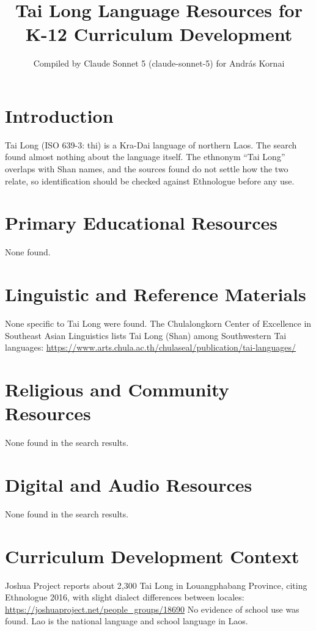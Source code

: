 \documentclass[12pt]{article}
\title{Tai Long Language Resources for K-12 Curriculum Development}
\author{Compiled by Claude Sonnet 5 (claude-sonnet-5) for Andr\'as Kornai}
\date{}
\begin{document}
\maketitle

\section{Introduction}
Tai Long (ISO 639-3: thi) is a Kra-Dai language of northern Laos. The search found almost nothing about the language itself. The ethnonym ``Tai Long'' overlaps with Shan names, and the sources found do not settle how the two relate, so identification should be checked against Ethnologue before any use.

\section{Primary Educational Resources}
None found.

\section{Linguistic and Reference Materials}
None specific to Tai Long were found. The Chulalongkorn Center of Excellence in Southeast Asian Linguistics lists Tai Long (Shan) among Southwestern Tai languages:
\url{https://www.arts.chula.ac.th/chulaseal/publication/tai-languages/}

\section{Religious and Community Resources}
None found in the search results.

\section{Digital and Audio Resources}
None found in the search results.

\section{Curriculum Development Context}
Joshua Project reports about 2,300 Tai Long in Louangphabang Province, citing Ethnologue 2016, with slight dialect differences between locales:
\url{https://joshuaproject.net/people_groups/18690}
No evidence of school use was found. Lao is the national language and school language in Laos.
\end{document}

